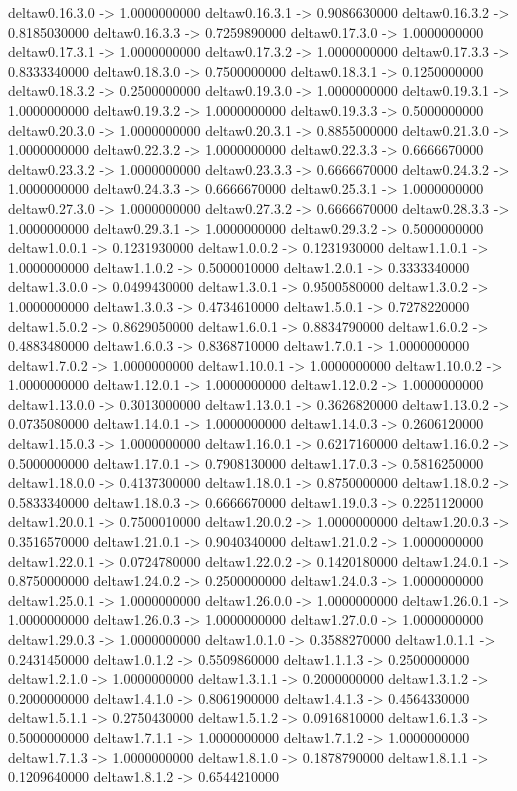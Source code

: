 deltaw0.16.3.0 -> 1.0000000000    deltaw0.16.3.1 -> 0.9086630000    deltaw0.16.3.2 -> 0.8185030000    deltaw0.16.3.3 -> 0.7259890000    deltaw0.17.3.0 -> 1.0000000000    deltaw0.17.3.1 -> 1.0000000000    deltaw0.17.3.2 -> 1.0000000000    deltaw0.17.3.3 -> 0.8333340000    deltaw0.18.3.0 -> 0.7500000000    deltaw0.18.3.1 -> 0.1250000000    deltaw0.18.3.2 -> 0.2500000000    deltaw0.19.3.0 -> 1.0000000000    deltaw0.19.3.1 -> 1.0000000000    deltaw0.19.3.2 -> 1.0000000000    deltaw0.19.3.3 -> 0.5000000000    deltaw0.20.3.0 -> 1.0000000000    deltaw0.20.3.1 -> 0.8855000000    deltaw0.21.3.0 -> 1.0000000000    deltaw0.22.3.2 -> 1.0000000000    deltaw0.22.3.3 -> 0.6666670000    deltaw0.23.3.2 -> 1.0000000000    deltaw0.23.3.3 -> 0.6666670000    deltaw0.24.3.2 -> 1.0000000000    deltaw0.24.3.3 -> 0.6666670000    deltaw0.25.3.1 -> 1.0000000000    deltaw0.27.3.0 -> 1.0000000000    deltaw0.27.3.2 -> 0.6666670000    deltaw0.28.3.3 -> 1.0000000000    deltaw0.29.3.1 -> 1.0000000000    deltaw0.29.3.2 -> 0.5000000000    deltaw1.0.0.1 -> 0.1231930000    deltaw1.0.0.2 -> 0.1231930000    deltaw1.1.0.1 -> 1.0000000000    deltaw1.1.0.2 -> 0.5000010000    deltaw1.2.0.1 -> 0.3333340000    deltaw1.3.0.0 -> 0.0499430000    deltaw1.3.0.1 -> 0.9500580000    deltaw1.3.0.2 -> 1.0000000000    deltaw1.3.0.3 -> 0.4734610000    deltaw1.5.0.1 -> 0.7278220000    deltaw1.5.0.2 -> 0.8629050000    deltaw1.6.0.1 -> 0.8834790000    deltaw1.6.0.2 -> 0.4883480000    deltaw1.6.0.3 -> 0.8368710000    deltaw1.7.0.1 -> 1.0000000000    deltaw1.7.0.2 -> 1.0000000000    deltaw1.10.0.1 -> 1.0000000000    deltaw1.10.0.2 -> 1.0000000000    deltaw1.12.0.1 -> 1.0000000000    deltaw1.12.0.2 -> 1.0000000000    deltaw1.13.0.0 -> 0.3013000000    deltaw1.13.0.1 -> 0.3626820000    deltaw1.13.0.2 -> 0.0735080000    deltaw1.14.0.1 -> 1.0000000000    deltaw1.14.0.3 -> 0.2606120000    deltaw1.15.0.3 -> 1.0000000000    deltaw1.16.0.1 -> 0.6217160000    deltaw1.16.0.2 -> 0.5000000000    deltaw1.17.0.1 -> 0.7908130000    deltaw1.17.0.3 -> 0.5816250000    deltaw1.18.0.0 -> 0.4137300000    deltaw1.18.0.1 -> 0.8750000000    deltaw1.18.0.2 -> 0.5833340000    deltaw1.18.0.3 -> 0.6666670000    deltaw1.19.0.3 -> 0.2251120000    deltaw1.20.0.1 -> 0.7500010000    deltaw1.20.0.2 -> 1.0000000000    deltaw1.20.0.3 -> 0.3516570000    deltaw1.21.0.1 -> 0.9040340000    deltaw1.21.0.2 -> 1.0000000000    deltaw1.22.0.1 -> 0.0724780000    deltaw1.22.0.2 -> 0.1420180000    deltaw1.24.0.1 -> 0.8750000000    deltaw1.24.0.2 -> 0.2500000000    deltaw1.24.0.3 -> 1.0000000000    deltaw1.25.0.1 -> 1.0000000000    deltaw1.26.0.0 -> 1.0000000000    deltaw1.26.0.1 -> 1.0000000000    deltaw1.26.0.3 -> 1.0000000000    deltaw1.27.0.0 -> 1.0000000000    deltaw1.29.0.3 -> 1.0000000000    deltaw1.0.1.0 -> 0.3588270000    deltaw1.0.1.1 -> 0.2431450000    deltaw1.0.1.2 -> 0.5509860000    deltaw1.1.1.3 -> 0.2500000000    deltaw1.2.1.0 -> 1.0000000000    deltaw1.3.1.1 -> 0.2000000000    deltaw1.3.1.2 -> 0.2000000000    deltaw1.4.1.0 -> 0.8061900000    deltaw1.4.1.3 -> 0.4564330000    deltaw1.5.1.1 -> 0.2750430000    deltaw1.5.1.2 -> 0.0916810000    deltaw1.6.1.3 -> 0.5000000000    deltaw1.7.1.1 -> 1.0000000000    deltaw1.7.1.2 -> 1.0000000000    deltaw1.7.1.3 -> 1.0000000000    deltaw1.8.1.0 -> 0.1878790000    deltaw1.8.1.1 -> 0.1209640000    deltaw1.8.1.2 -> 0.6544210000    